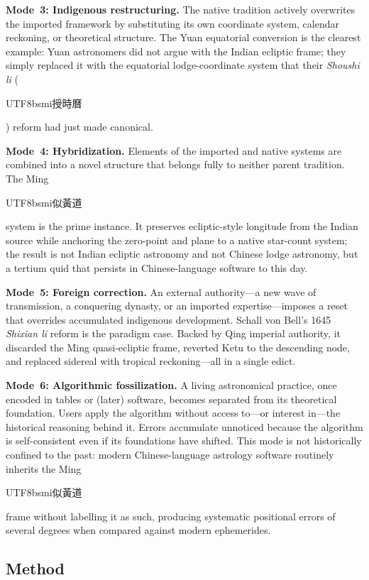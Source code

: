\documentclass[10pt,a4paper]{article}
\newcommand{\zh}[1]{\begin{CJK}{UTF8}{bsmi}#1\end{CJK}}
\begin{document}
\textbf{Mode~3: Indigenous restructuring.}  The native tradition actively
overwrites the imported framework by substituting its own coordinate system,
calendar reckoning, or theoretical structure.  The Yuan equatorial conversion
is the clearest example: Yuan astronomers did not argue with the Indian ecliptic
frame; they simply replaced it with the equatorial lodge-coordinate system that
their \textit{Shoushi li} (\zh{授時曆}) reform had just made canonical.

\textbf{Mode~4: Hybridization.}  Elements of the imported and native systems are
combined into a novel structure that belongs fully to neither parent tradition.
The Ming \zh{似黃道} system is the prime instance.  It preserves ecliptic-style
longitude from the Indian source while anchoring the zero-point and plane to a
native star-count system; the result is not Indian ecliptic astronomy and not
Chinese lodge astronomy, but a tertium quid that persists in Chinese-language
software to this day.

\textbf{Mode~5: Foreign correction.}  An external authority---a new wave of
transmission, a conquering dynasty, or an imported expertise---imposes a reset
that overrides accumulated indigenous development.  Schall von Bell's 1645
\textit{Shixian li} reform is the paradigm case.  Backed by Qing imperial
authority, it discarded the Ming quasi-ecliptic frame, reverted Ketu to the
descending node, and replaced sidereal with tropical reckoning---all in a single
edict.

\textbf{Mode~6: Algorithmic fossilization.}  A living astronomical practice,
once encoded in tables or (later) software, becomes separated from its theoretical
foundation.  Users apply the algorithm without access to---or interest in---the
historical reasoning behind it.  Errors accumulate unnoticed because the algorithm
is self-consistent even if its foundations have shifted.  This mode is not
historically confined to the past: modern Chinese-language astrology software
routinely inherits the Ming \zh{似黃道} frame without labelling it as such,
producing systematic positional errors of several degrees when compared against
modern ephemerides.

\subsection*{Method}
\end{document}
